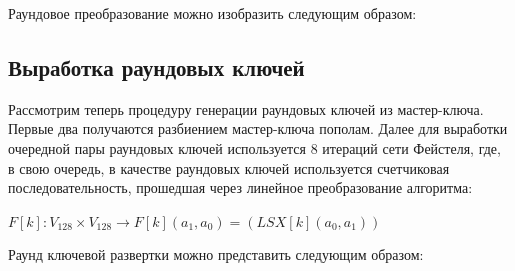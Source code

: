 \documentclass[a4paper,14pt]{report}
\begin{document}
    \hfill \break
Раундовое преобразование можно изобразить следующим образом:


\begin{figure}[h]
\label{fig:image}
\end{figure}

  \subsection{Выработка раундовых ключей}

Рассмотрим теперь процедуру генерации раундовых ключей из мастер-ключа. Первые два получаются разбиением мастер-ключа пополам. Далее для выработки очередной пары раундовых ключей используется 8 итераций сети Фейстеля, где, в свою очередь, в качестве раундовых ключей используется счетчиковая последовательность, прошедшая через линейное преобразование алгоритма:

$F[k]: V_{128} \times V_{128} \rightarrow F[k](a_{1}, a_{0}) = (LSX[k](a_{0}, a_{1}))$
    \hfill \break
    
Раунд ключевой развертки можно представить следующим образом:
\end{document}
